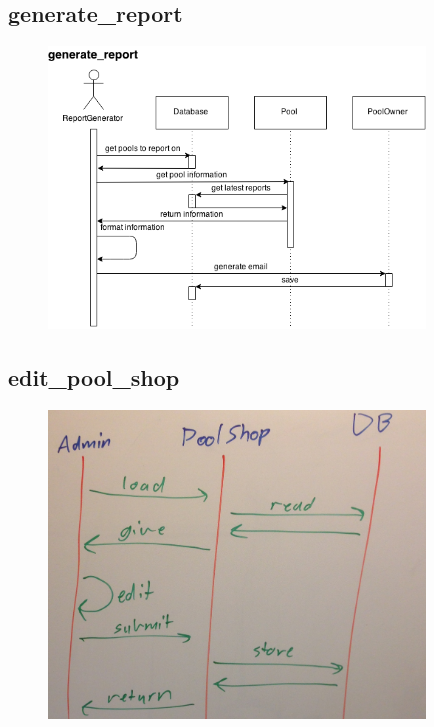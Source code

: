 \subsection{generate\_report}
\begin{figure}[!ht]
\begin{center}
	\includegraphics[width=10cm]{images/generate_report}
	\caption{}
\end{center}
\end{figure}

\FloatBarrier
\subsection{edit\_pool\_shop}
\begin{figure}[!ht]
\begin{center}
	\includegraphics[width=10cm]{images/edit_pool_shop}
	\caption{}
\end{center}
\end{figure}

\FloatBarrier
